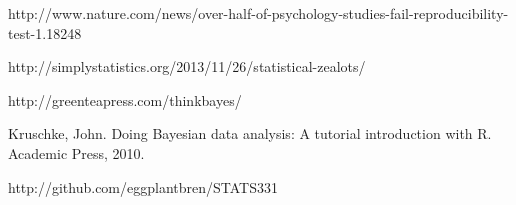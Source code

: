 \documentclass[a4paper, 12pt]{article}
\begin{document}
\begin{thebibliography}{999} %
http://www.nature.com/news/over-half-of-psychology-studies-fail-reproducibility-test-1.18248

http://simplystatistics.org/2013/11/26/statistical-zealots/

http://greenteapress.com/thinkbayes/

Kruschke, John. Doing Bayesian data analysis: A tutorial introduction with R. Academic Press, 2010.

http://github.com/eggplantbren/STATS331

\end{thebibliography}
\end{document}
